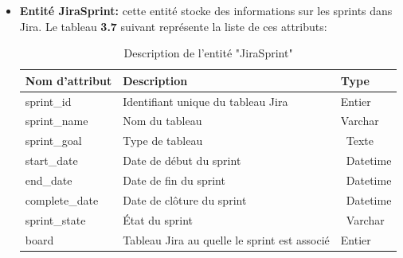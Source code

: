 \begin{itemize}
\begin{center}
        \end{center}
        \vspace{-1cm}
        \item \textbf{Entité JiraSprint:} cette entité stocke des informations sur les sprints dans Jira.
        Le tableau \textbf{3.7} suivant représente la liste de ces attributs:
        \begin{center}   
                \begin{longtable}{|p{3cm}|p{11cm}|p{2cm}|}
                    \caption {Description de l'entité "JiraSprint"} \\
                    \hline
                    \rowcolor{blue!18}\textbf{\large{Nom d'attribut}} & \textbf{\large{Description}} & \textbf{\large{Type}} \\
                    \hline
                    sprint\_id&  Identifiant unique du tableau Jira &  Entier\\\hline
                    sprint\_name& Nom du tableau& Varchar\\\hline
                    sprint\_goal& Type de tableau &\ Texte\\\hline
                    start\_date& Date de début du sprint&\ Datetime\\\hline
                    end\_date& Date de fin du sprint&\ Datetime\\\hline
                    complete\_date& Date de clôture du sprint&\ Datetime\\\hline
                    sprint\_state & État du sprint &\ Varchar\\\hline
                    board&Tableau Jira  au quelle le sprint est associé &Entier\\\hline
                                   

\end{longtable}
\end{center}
\end{itemize}
